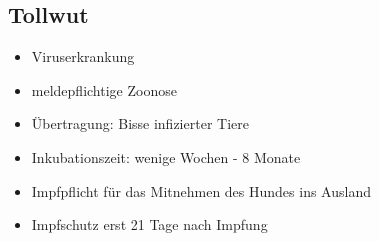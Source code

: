     \subsection{Tollwut}
    \begin{itemize}
        \item Viruserkrankung
        \item meldepflichtige Zoonose
        \item Übertragung: Bisse infizierter Tiere
        \item Inkubationszeit: wenige Wochen - 8 Monate
        \item Impfpflicht für das Mitnehmen des Hundes ins Ausland
        \item Impfschutz erst 21 Tage nach Impfung
    \end{itemize}